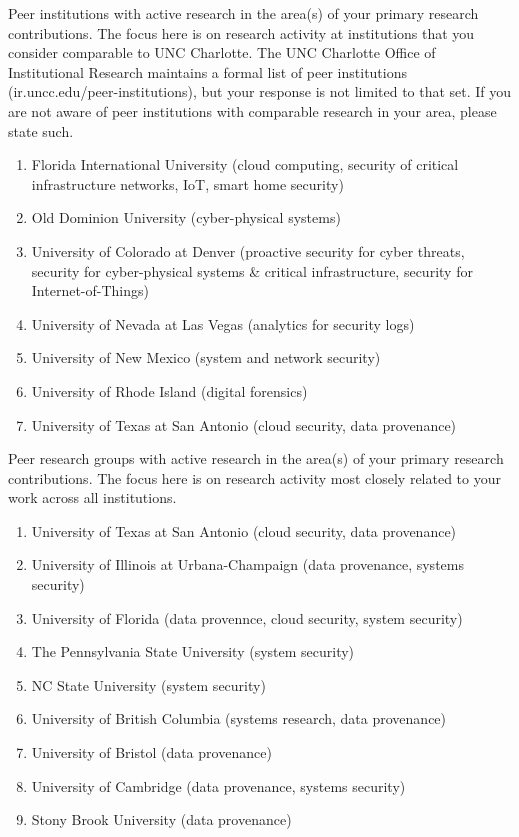 
\newpage
\setcounter{page}{1}

\begin{quotationb}
Peer institutions with active research in the area(s) of your primary research contributions. The focus here is on research activity at institutions that you consider comparable to UNC Charlotte. The UNC Charlotte Office of Institutional Research maintains a formal list of peer institutions (ir.uncc.edu/peer-institutions), but your response is not limited to that set. If you are not aware of peer institutions with comparable research in your area, please state such.
\end{quotationb}

\begin{enumerate}
\item Florida International University (cloud computing, security of critical infrastructure networks, IoT, smart home security)
\item Old Dominion University (cyber-physical systems)
\item University of Colorado at Denver (proactive security for cyber threats, security for cyber-physical systems \& critical infrastructure, security for Internet-of-Things)
\item University of Nevada at Las Vegas (analytics for security logs)
\item University of New Mexico (system and network security)
\item University of Rhode Island (digital forensics)
\item University of Texas at San Antonio (cloud security, data provenance)
\end{enumerate}

\begin{quotationb}
Peer research groups with active research in the area(s) of your primary research contributions. The focus here is on research activity most closely related to your work across all institutions.
\end{quotationb}

\begin{enumerate}
\item University of Texas at San Antonio (cloud security, data provenance)
\item University of Illinois at Urbana-Champaign (data provenance, systems security)
\item University of Florida (data provennce, cloud security, system security)
\item The Pennsylvania State University (system security)
\item NC State University (system security)
\item University of British Columbia (systems research, data provenance)
\item University of Bristol (data provenance)
\item University of Cambridge (data provenance, systems security)
\item Stony Brook University (data provenance)
\end{enumerate}
